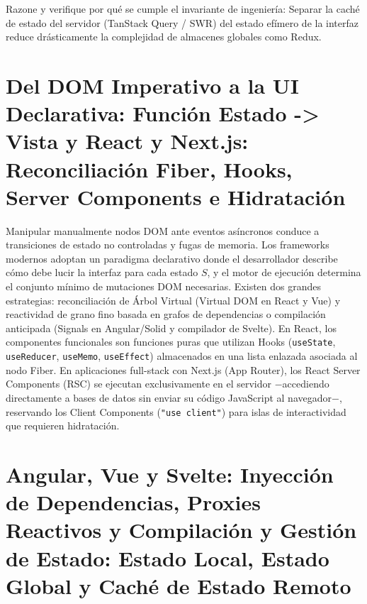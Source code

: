 \documentclass{book}
\begin{document}
\begin{tcolorbox}[title={Autoficha}, studiumcheck, breakable]

Razone y verifique por qué se cumple el invariante de ingeniería: Separar la caché de estado del servidor (TanStack Query / SWR) del estado efímero de la interfaz reduce drásticamente la complejidad de almacenes globales como Redux.
\end{tcolorbox}

\section{Del DOM Imperativo a la UI Declarativa: Función Estado -> Vista y React y Next.js: Reconciliación Fiber, Hooks, Server Components e Hidratación}

Manipular manualmente nodos DOM ante eventos asíncronos conduce a transiciones de estado no controladas y fugas de memoria. Los frameworks modernos adoptan un paradigma declarativo donde el desarrollador describe cómo debe lucir la interfaz para cada estado \(S\), y el motor de ejecución determina el conjunto mínimo de mutaciones DOM necesarias. Existen dos grandes estrategias: reconciliación de Árbol Virtual (Virtual DOM en React y Vue) y reactividad de grano fino basada en grafos de dependencias o compilación anticipada (Signals en Angular/Solid y compilador de Svelte).
En React, los componentes funcionales son funciones puras que utilizan Hooks (\texttt{useState}, \texttt{useReducer}, \texttt{useMemo}, \texttt{useEffect}) almacenados en una lista enlazada asociada al nodo Fiber. En aplicaciones full-stack con Next.js (App Router), los React Server Components (RSC) se ejecutan exclusivamente en el servidor \(-\)accediendo directamente a bases de datos sin enviar su código JavaScript al navegador\(-\), reservando los Client Components (\texttt{"use client"}) para islas de interactividad que requieren hidratación.

\section{Angular, Vue y Svelte: Inyección de Dependencias, Proxies Reactivos y Compilación y Gestión de Estado: Estado Local, Estado Global y Caché de Estado Remoto}
\end{document}
